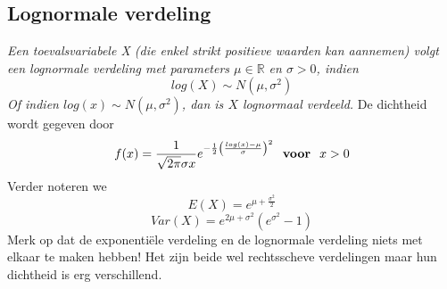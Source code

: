 \documentclass[titlepage]{article}
\numberwithin{equation}{section}
\begin{document}
\subsection{Lognormale verdeling}
\emph{Een toevalsvariabele X (die enkel strikt positieve waarden kan aannemen) volgt een lognormale verdeling met parameters $\mu \in \mathbb{R}$ en $\sigma > 0$, indien}
\begin{equation*}
	log(X) \sim N(\mu, \sigma^2)
\end{equation*}
\emph{Of indien $log(x)\sim N(\mu,\sigma^2)$, dan is $X$ lognormaal verdeeld.}\newline\newline
De dichtheid wordt gegeven door
\begin{equation}
	f(x) = \frac{1}{\sqrt{2\pi}\sigma x}e^{-\frac{1}{2}\left(\frac{log(x)-\mu}{\sigma}\right)^2} \text{ \textbf{ voor } } x>0
	\label{4.39}
\end{equation}
Verder noteren we
\begin{equation}
	E(X) = e^{\mu+\frac{\sigma^2}{2}}
	\label{4.40}
\end{equation}
\begin{equation}
	Var(X) = e^{2\mu+\sigma^2}\left(e^{\sigma^2} -1 \right)
	\label{4.41}
\end{equation}
\danger Merk op dat de exponentiële verdeling en de lognormale verdeling niets met elkaar te maken hebben! Het zijn beide wel rechtsscheve verdelingen maar hun dichtheid is erg verschillend.
\end{document}
